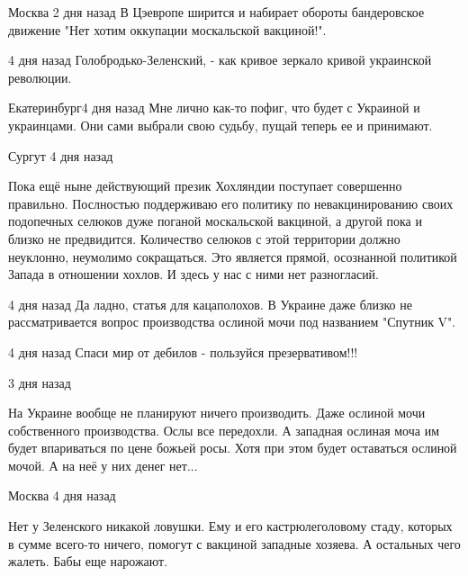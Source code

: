 \begin{itemize}

 Москва 2 дня назад  
В Цэевропе ширится и набирает обороты бандеровское движение "Нет хотим оккупации москальской вакциной!".

 4 дня назад  
Голобродько-Зеленский, - как кривое зеркало кривой украинской революции.

 Екатеринбург4 дня назад  
Мне лично как-то пофиг, что будет с Украиной и украинцами. Они сами выбрали свою судьбу, пущай теперь ее и принимают.

 Сургут 4 дня назад  

Пока ещё ныне действующий презик Хохляндии поступает совершенно правильно.
Послностью поддерживаю его политику по невакцинированию своих подопечных
селюков дуже поганой москальской вакциной, а другой пока и близко не
предвидится. Количество селюков с этой территории должно неуклонно, неумолимо
сокращаться. Это является прямой, осознанной политикой Запада в отношении
хохлов. И здесь у нас с ними нет разногласий.

 4 дня назад  
Да ладно, статья для кацаполохов. В Украине даже близко не рассматривается
вопрос производства ослиной мочи под названием "Спутник V".

 4 дня назад
Спаси мир от дебилов - пользуйся презервативом!!! 

 3 дня назад

На Украине вообще не планируют ничего производить. Даже ослиной мочи
собственного производства. Ослы все передохли. А западная ослиная моча им будет
впариваться по цене божьей росы. Хотя при этом будет оставаться ослиной мочой.
А на неё у них денег нет...

 Москва 4 дня назад  

Нет у Зеленского никакой ловушки. Ему и его кастрюлеголовому стаду, которых в
сумме всего-то ничего, помогут с вакциной западные хозяева. А остальных чего
жалеть. Бабы еще нарожают.
\end{itemize}
